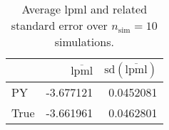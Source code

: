 \begin{table}[H]

\caption{Average lpml and related standard error over $n_{\text{sim}} = 10$ simulations.}
\centering
\begin{tabular}[t]{lrr}
\toprule
  & $\overbar{\text{lpml}}$ & $\text{sd}(\overbar{\text{lpml}})$\\
\midrule
PY & -3.677121 & 0.0452081\\
True & -3.661961 & 0.0462801\\
\bottomrule
\end{tabular}
\end{table}